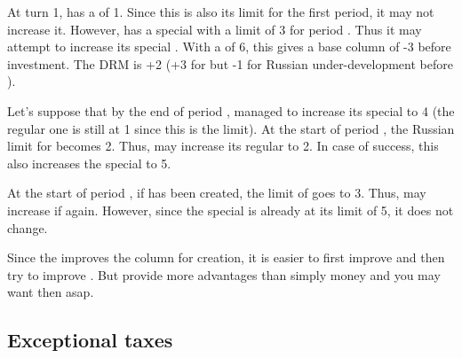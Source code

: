 \begin{exemple}
  At turn 1, \RUS has a \FTI of 1. Since this is also its limit for the first
  period, it may not increase it. However, \RUS has a special \FTI with a
  limit of 3 for period . Thus it may attempt to increase its
  special \FTI. With a \ADM of 6, this gives a base column of -3 before
  investment. The DRM is +2 (+3 for \STAB but -1 for Russian under-development
  before ).

  Let's suppose that by the end of period , \RUS managed to increase
  its special \FTI to 4 (the regular one is still at 1 since this is the
  limit). At the start of period , the Russian limit for \FTI
  becomes 2. Thus, \RUS may increase its regular \FTI to 2. In case of
  success, this also increases the special \FTI to 5.

  At the start of period , if  has been
  created, the limit of \FTI goes to 3. Thus, \RUS may increase if
  again. However, since the special \FTI is already at its limit of 5, it does
  not change.
\end{exemple}


\begin{playtip}
  Since the \DTI improves the column for \MNU creation, it is easier to first
  improve \DTI and then try to improve \MNU. But \MNU provide more advantages
  than simply money and you may want then asap.
\end{playtip}



\subsection{Exceptional taxes}\label{chAdministration:Exceptional Taxes}

